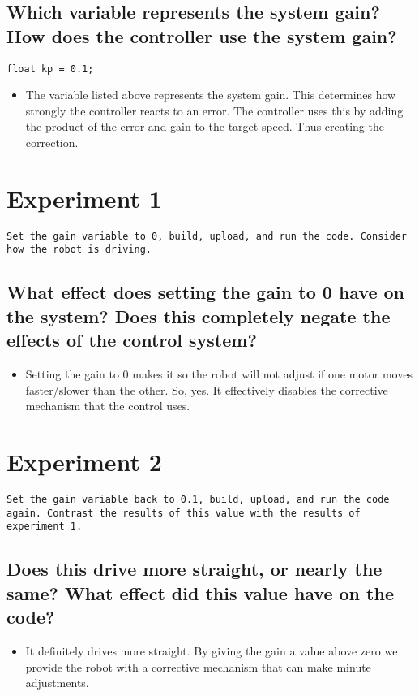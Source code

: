\documentclass[11pt]{article}
\begin{document}
\subsection{Which variable represents the system gain? How does the controller use the system gain?}
\label{sec:orga59417a}
\begin{verbatim}
float kp = 0.1;
\end{verbatim}
\begin{itemize}
\item The variable listed above represents the system gain. This determines how strongly the controller reacts to an error. The controller uses this by adding the product of the error and gain to the target speed. Thus creating the correction.
\end{itemize}
\section{Experiment 1}
\label{sec:orga8f3bfd}
\texttt{Set the gain variable to 0, build, upload, and run the code. Consider how the robot is driving.}
\subsection{What effect does setting the gain to 0 have on the system? Does this completely negate the effects of the control system?}
\label{sec:org5cf24e2}
\begin{itemize}
\item Setting the gain to 0 makes it so the robot will not adjust if one motor moves faster/slower than the other. So, yes. It effectively disables the corrective mechanism that the control uses.
\end{itemize}
\section{Experiment 2}
\label{sec:orgbe12be2}
\texttt{Set the gain variable back to 0.1, build, upload, and run the code again. Contrast the results of this value with the results of experiment 1.}
\subsection{Does this drive more straight, or nearly the same? What effect did this value have on the code?}
\label{sec:org1ac1772}
\begin{itemize}
\item It definitely drives more straight. By giving the gain a value above zero we provide the robot with a corrective mechanism that can make minute adjustments.
\end{itemize}
\end{document}
